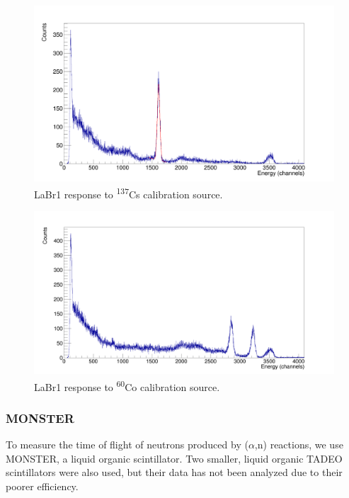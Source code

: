 \documentclass[a4paper,12pt]{report}
\newcommand{\an}{($\alpha$,n) }
\begin{document}
\begin{figure}[H]
	\centering
	\includegraphics[width=\textwidth]{labr_cs137_calibration.png}
	\caption{LaBr1 response to \textsuperscript{137}Cs calibration source.}
	\label{labr_cs137_calibration}
\end{figure}

\begin{figure}[H]
	\centering
	\includegraphics[width=\textwidth]{labr_co60_calibration.png}
	\caption{LaBr1 response to \textsuperscript{60}Co calibration source.}
	\label{labr_co60_calibration}
\end{figure}

\subsubsection{MONSTER}
To measure the time of flight of neutrons produced by \an reactions, we use MONSTER, a liquid organic scintillator.
Two smaller, liquid organic TADEO scintillators were also used, but their data has not been analyzed due to their poorer efficiency.
\\
\end{document}
